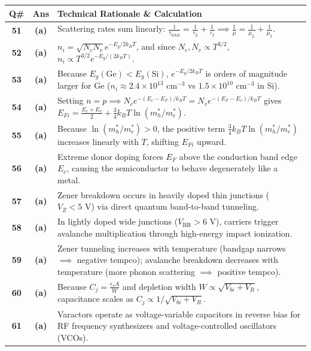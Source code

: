 {\small
\noindent\begin{tabularx}{\textwidth}{|c|c|X|}
\hline
\textbf{Q\#} & \textbf{Ans} & \textbf{Technical Rationale \& Calculation} \\
\hline
\textbf{51} & \textbf{(a)} & Scattering rates sum linearly: $\frac{1}{\tau_{\text{total}}} = \frac{1}{\tau_L} + \frac{1}{\tau_I} \implies \frac{1}{\mu} = \frac{1}{\mu_L} + \frac{1}{\mu_I}$. \\ \hline
\textbf{52} & \textbf{(a)} & $n_i = \sqrt{N_c N_v}e^{-E_g/2k_BT}$, and since $N_c, N_v \propto T^{3/2}$, $n_i \propto T^{3/2} e^{-E_g/(2k_BT)}$. \\ \hline
\textbf{53} & \textbf{(a)} & Because $E_g(\text{Ge}) < E_g(\text{Si})$, $e^{-E_g/2k_BT}$ is orders of magnitude larger for Ge ($n_i \approx 2.4 \times 10^{13}\text{ cm}^{-3}$ vs $1.5 \times 10^{10}\text{ cm}^{-3}$ in Si). \\ \hline
\textbf{54} & \textbf{(a)} & Setting $n = p \implies N_c e^{-(E_c-E_F)/k_BT} = N_v e^{-(E_F-E_v)/k_BT}$ gives $E_{Fi} = \frac{E_c+E_v}{2} + \frac{3}{4}k_BT\ln(m_h^*/m_e^*)$. \\ \hline
\textbf{55} & \textbf{(a)} & Because $\ln(m_h^*/m_e^*) > 0$, the positive term $\frac{3}{4}k_BT\ln(m_h^*/m_e^*)$ increases linearly with $T$, shifting $E_{Fi}$ upward. \\ \hline
\textbf{56} & \textbf{(a)} & Extreme donor doping forces $E_F$ above the conduction band edge $E_c$, causing the semiconductor to behave degenerately like a metal. \\ \hline
\textbf{57} & \textbf{(a)} & Zener breakdown occurs in heavily doped thin junctions ($V_Z < 5\text{ V}$) via direct quantum band-to-band tunneling. \\ \hline
\textbf{58} & \textbf{(a)} & In lightly doped wide junctions ($V_{\text{BR}} > 6\text{ V}$), carriers trigger avalanche multiplication through high-energy impact ionization. \\ \hline
\textbf{59} & \textbf{(a)} & Zener tunneling increases with temperature (bandgap narrows $\implies$ negative tempco); avalanche breakdown decreases with temperature (more phonon scattering $\implies$ positive tempco). \\ \hline
\textbf{60} & \textbf{(a)} & Because $C_j = \frac{\epsilon_s A}{W}$ and depletion width $W \propto \sqrt{V_{bi} + V_R}$, capacitance scales as $C_j \propto 1/\sqrt{V_{bi} + V_R}$. \\ \hline
\textbf{61} & \textbf{(a)} & Varactors operate as voltage-variable capacitors in reverse bias for RF frequency synthesizers and voltage-controlled oscillators (VCOs). \\ \hline

\end{tabularx}}

